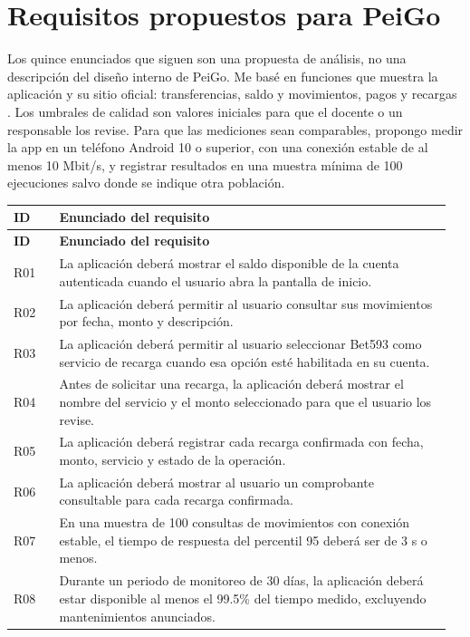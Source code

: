 \documentclass[10pt,letterpaper]{article}
\begin{document}
\section{Requisitos propuestos para PeiGo}
Los quince enunciados que siguen son una propuesta de análisis, no una descripción del diseño interno de PeiGo. Me basé en funciones que muestra la aplicación y su sitio oficial: transferencias, saldo y movimientos, pagos y recargas \cite{peigoFaq,peigoTerms}. Los umbrales de calidad son valores iniciales para que el docente o un responsable los revise. Para que las mediciones sean comparables, propongo medir la app en un teléfono Android 10 o superior, con una conexión estable de al menos 10 Mbit/s, y registrar resultados en una muestra mínima de 100 ejecuciones salvo donde se indique otra población.

\small
\begin{longtable}{@{}p{0.10\linewidth}p{0.86\linewidth}@{}}
\toprule\rowcolor{azulclaro}\textbf{ID} & \textbf{Enunciado del requisito}\\\midrule\endfirsthead
\toprule\rowcolor{azulclaro}\textbf{ID} & \textbf{Enunciado del requisito}\\\midrule\endhead
R01 & La aplicación deberá mostrar el saldo disponible de la cuenta autenticada cuando el usuario abra la pantalla de inicio.\\
R02 & La aplicación deberá permitir al usuario consultar sus movimientos por fecha, monto y descripción.\\
R03 & La aplicación deberá permitir al usuario seleccionar Bet593 como servicio de recarga cuando esa opción esté habilitada en su cuenta.\\
R04 & Antes de solicitar una recarga, la aplicación deberá mostrar el nombre del servicio y el monto seleccionado para que el usuario los revise.\\
R05 & La aplicación deberá registrar cada recarga confirmada con fecha, monto, servicio y estado de la operación.\\
R06 & La aplicación deberá mostrar al usuario un comprobante consultable para cada recarga confirmada.\\
R07 & En una muestra de 100 consultas de movimientos con conexión estable, el tiempo de respuesta del percentil 95 deberá ser de 3 s o menos.\\
R08 & Durante un periodo de monitoreo de 30 días, la aplicación deberá estar disponible al menos el 99.5\% del tiempo medido, excluyendo mantenimientos anunciados.\\

\end{longtable}
\end{document}
